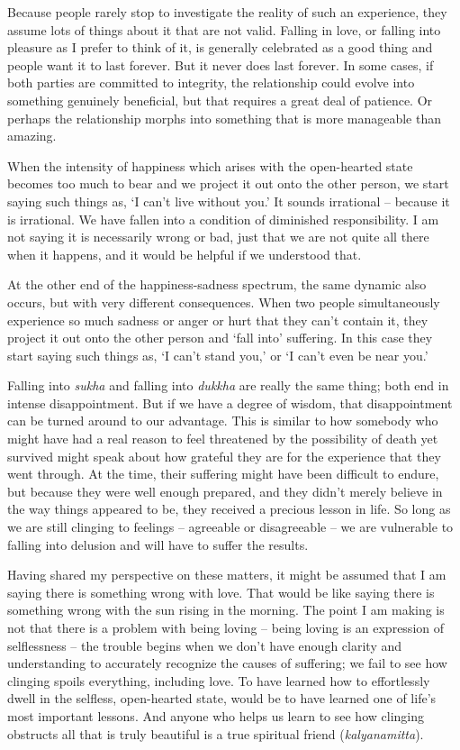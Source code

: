 \enlargethispage*{2\baselineskip}

Because people rarely stop to investigate the reality of such an
experience, they assume lots of things about it that are not valid.
Falling in love, or falling into pleasure as I prefer to think of it, is
generally celebrated as a good thing and people want it to last forever.
But it never does last forever. In some cases, if both parties are
committed to integrity, the relationship could evolve into something
genuinely beneficial, but that requires a great deal of patience. Or
perhaps the relationship morphs into something that is more manageable
than amazing.

When the intensity of happiness which arises with the open-hearted state
becomes too much to bear and we project it out onto the other person, we
start saying such things as, `I can't live without you.' It sounds
irrational -- because it is irrational. We have fallen into a condition
of diminished responsibility. I am not saying it is necessarily wrong or
bad, just that we are not quite all there when it happens, and it would
be helpful if we understood that.

At the other end of the happiness-sadness spectrum, the same dynamic
also occurs, but with very different consequences. When two people
simultaneously experience so much sadness or anger or hurt that they
can't contain it, they project it out onto the other person and `fall
into' suffering. In this case they start saying such things as, `I can't
stand you,' or `I can't even be near you.'

Falling into \emph{sukha} and falling into \emph{dukkha} are really the
same thing; both end in intense disappointment. But if we have a degree
of wisdom, that disappointment can be turned around to our advantage.
This is similar to how somebody who
might have had a real reason to feel threatened by the
possibility of death yet survived might speak about how grateful they
are for the experience that they went through. At the time, their
suffering might have been difficult to endure, but because they were
well enough prepared, and they didn't merely believe in the way things
appeared to be, they received a precious lesson in life. So long as we
are still clinging to feelings -- agreeable or disagreeable -- we are
vulnerable to falling into delusion and will have to suffer the results.

Having shared my perspective on these matters, it might be assumed that
I am saying there is something wrong with love. That would be like
saying there is something wrong with the sun rising in the morning. The
point I am making is not that there is a problem with being loving --
being loving is an expression of selflessness -- the trouble begins when
we don't have enough clarity and understanding to accurately recognize
the causes of suffering; we fail to see how clinging spoils everything,
including love. To have learned how to effortlessly dwell in the
selfless, open-hearted state, would be to have learned one of life's
most important lessons. And anyone who helps us learn to see how
clinging obstructs all that is truly beautiful is a true spiritual
friend (\emph{kalyanamitta}).

